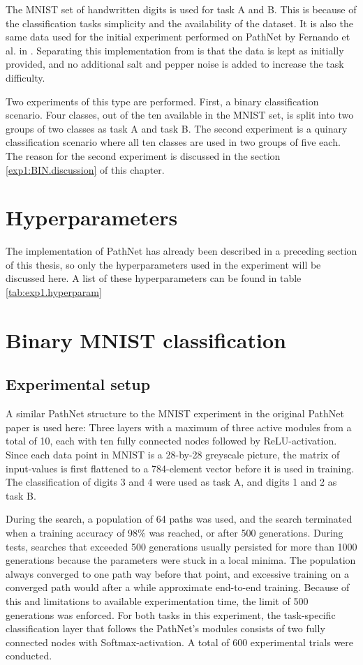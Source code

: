 The MNIST set of handwritten digits is used for task A and B. This is because of the classification tasks simplicity and the availability of the dataset. It is also the same data used for the initial experiment performed on PathNet by Fernando et al. in \cite{pathnet}. Separating this implementation from \cite{pathnet} is that the data is kept as initially provided, and no additional salt and pepper noise is added to increase the task difficulty. 

Two experiments of this type are performed. First, a binary classification scenario. Four classes, out of the ten available in the MNIST set, is split into two groups of two classes as task A and task B. The second experiment is a quinary classification scenario where all ten classes are used in two groups of five each. The reason for the second experiment is discussed in the section \ref{exp1:BIN.discussion} of this chapter. 

\section{Hyperparameters}
\label{exp1:implementation}
The implementation of PathNet has already been described in a preceding section of this thesis, so only the hyperparameters used in the experiment will be discussed here. A list of these hyperparameters can be found in table \ref{tab:exp1.hyperparam}



\section{Binary MNIST classification}

\subsection{Experimental setup}
A similar PathNet structure to the MNIST experiment in the original PathNet paper is used here: Three layers with a maximum of three active modules from a total of 10, each with ten fully connected nodes followed by ReLU-activation. Since each data point in MNIST is a 28-by-28 greyscale picture, the matrix of input-values is first flattened to a 784-element vector before it is used in training. The classification of digits 3 and 4 were used as task A, and digits 1 and 2 as task B. 

During the search, a population of 64 paths was used, and the search terminated when a training accuracy of 98\% was reached, or after 500 generations. During tests, searches that exceeded 500 generations usually persisted for more than 1000 generations because the parameters were stuck in a local minima. The population always converged to one path way before that point, and excessive training on a converged path would after a while approximate end-to-end training. Because of this and limitations to available experimentation time, the limit of 500 generations was enforced. For both tasks in this experiment, the task-specific classification layer that follows the PathNet's modules consists of two fully connected nodes with Softmax-activation. A total of 600 experimental trials were conducted.  

